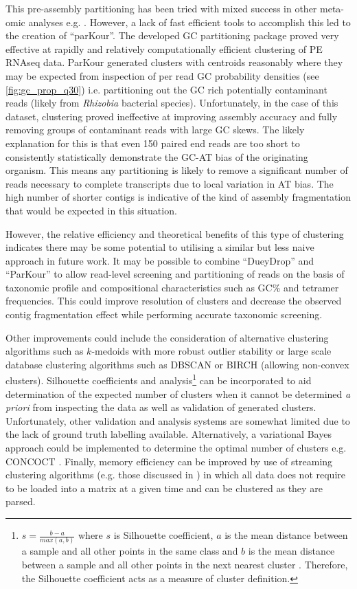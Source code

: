 This pre-assembly partitioning has been tried with mixed success in other meta-omic analyses e.g. \citet{Droge2012}.
However, a lack of fast efficient tools to accomplish this led to the creation of ``parKour''.
The developed GC partitioning package proved very effective at rapidly and relatively computationally 
efficient clustering of PE RNAseq data. ParKour generated clusters with centroids
reasonably where they may be expected from inspection of per read GC probability densities (see \cref{fig:gc_prop_q30})
i.e. partitioning out the GC rich potentially contaminant reads (likely from \textit{Rhizobia}
bacterial species).  Unfortunately, in the case of this dataset, clustering proved ineffective
at improving assembly accuracy and fully removing groups of contaminant reads with large GC skews. 
The likely explanation for this is that even \SI{150}{\bp} paired end reads are too short to consistently
statistically demonstrate the GC-AT bias of the originating organism. This means any partitioning
is likely to remove a significant number of reads necessary to complete transcripts due to local
variation in AT bias.  The high number of shorter contigs is indicative of the kind of assembly
fragmentation that would be expected in this situation.

However, the relative efficiency and theoretical benefits of this type of clustering indicates there may be
some potential to utilising a similar but less naive approach in future work.
It may be possible to combine ``DueyDrop'' and ``ParKour'' to allow
read-level screening and partitioning of reads on the basis of taxonomic profile
and compositional characteristics such as GC\% and tetramer frequencies.
This could improve resolution of clusters and decrease the observed contig fragmentation
effect while performing accurate taxonomic screening. 

Other improvements could include the consideration of alternative clustering algorithms 
such as \(k\)-medoids \citep{Kaufman1987} with more robust outlier stability or large scale
database clustering algorithms such as DBSCAN \citep{Ester1996} or BIRCH \citep{Zhang1996} (allowing non-convex
clusters). Silhouette coefficients and analysis\footnote{
    \(s = \frac{b -a}{max(a,b)}\) where \(s\) is Silhouette coefficient, \(a\) is the mean distance
	between a sample and all other points in the same class and \(b\) is the mean distance
	between a sample and all other points in the next nearest cluster \citep{scikit-learn}.  Therefore,
	the Silhouette coefficient acts as a measure of cluster definition.}
\citep{Rousseeuw1987} can be incorporated to aid determination of the expected number of clusters when it cannot be determined
\textit{a priori} from inspecting the data as well as validation of generated clusters.  
Unfortunately, other validation and analysis systems are somewhat limited due to the lack of ground truth labelling 
available.  
Alternatively,
a variational Bayes approach could be implemented to determine the optimal number of clusters e.g. CONCOCT \citep{Alneberg2014}.
Finally, memory efficiency can be improved by use of streaming clustering algorithms (e.g. those discussed in
\citet{OCallaghan2002})
in which all data does not require to be loaded into a matrix at a given time and can be clustered
as they are parsed.  

